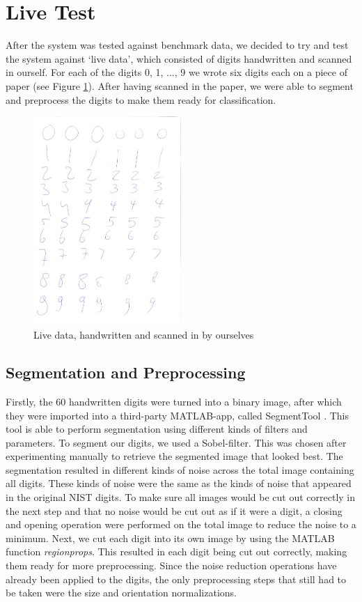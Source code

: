 \documentclass[11pt,twoside,a4paper]{article}
\begin{document}
\section{Live Test}
After the system was tested against benchmark data, we decided to try and test the system against `live data', which consisted of digits handwritten and scanned in ourself. For each of the digits 0, 1, ..., 9 we wrote six digits each on a piece of paper (see Figure \ref{img:livedata}). After having scanned in the paper, we were able to segment and preprocess the digits to make them ready for classification.

\begin{figure}[h]
  \centering
  \captionsetup{justification=centering}
  \includegraphics[width=0.5\textwidth]{livedata.jpeg}
  \caption{Live data, handwritten and scanned in by ourselves}
  \label{img:livedata}
\end{figure}

\subsection{Segmentation and Preprocessing}
Firstly, the 60 handwritten digits were turned into a binary image, after which they were imported into a third-party MATLAB-app, called SegmentTool \cite{segmenttool}. This tool is able to perform segmentation using different kinds of filters and parameters. To segment our digits, we used a Sobel-filter. This was chosen after experimenting manually to retrieve the segmented image that looked best.\newline
\newline
The segmentation resulted in different kinds of noise across the total image containing all digits. These kinds of noise were the same as the kinds of noise that appeared in the original NIST digits. To make sure all images would be cut out correctly in the next step and that no noise would be cut out as if it were a digit, a closing and opening operation were performed on the total image to reduce the noise to a minimum. Next, we cut each digit into its own image by using the MATLAB function \emph{regionprops}. This resulted in each digit being cut out correctly, making them ready for more preprocessing. Since the noise reduction operations have already been applied to the digits, the only preprocessing steps that still had to be taken were the size and orientation normalizations.
\end{document}
